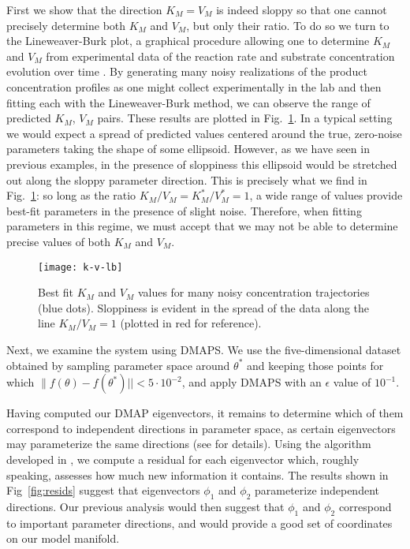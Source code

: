 First we show that the direction $K_M = V_M$ is indeed sloppy so that
one cannot precisely determine both $K_M$ and $V_M$, but only their
ratio. To do so we turn to the Lineweaver-Burk plot, a graphical
procedure allowing one to determine $K_M$ and $V_M$ from experimental
data of the reaction rate and substrate concentration evolution over
time \cite{lineweaver_determination_1934}. By generating many noisy realizations of the product
concentration profiles as one might collect experimentally in the lab
and then fitting each with the Lineweaver-Burk method, we can observe
the range of predicted $K_M$, $V_M$ pairs. These results are plotted
in Fig.~\ref{fig:lb}. In a typical setting we would expect a spread of
predicted values centered around the true, zero-noise parameters
taking the shape of some ellipsoid. However, as we have seen in
previous examples, in the presence of sloppiness this ellipsoid would
be stretched out along the sloppy parameter direction. This is
precisely what we find in Fig.~\ref{fig:lb}: so long as the ratio
$K_M/V_M = K_M^*/V_M^* = 1$, a wide range of values provide best-fit
parameters in the presence of slight noise. Therefore, when fitting
parameters in this regime, we must accept that we may not be able to
determine precise values of both $K_M$ and $V_M$.


\begin{figure}
  \centering
  \texttt{[image: k-v-lb]}
  \caption[Lineweaver-Burk fitting results]{Best fit $K_M$ and $V_M$ values for many noisy
    concentration trajectories (blue dots). Sloppiness is evident in
    the spread of the data along the line $K_M/V_M = 1$ (plotted in
    red for reference). \label{fig:lb} }
\end{figure}

Next, we examine the system using DMAPS. We use the five-dimensional
dataset obtained by sampling parameter space around $\theta^*$ and
keeping those points for which
$\|f(\theta) - f(\theta^*) || < 5 \cdot 10^{-2}$, and apply DMAPS
with an $\epsilon$ value of $10^{-1}$.

Having computed our DMAP eigenvectors, it remains to determine which
of them correspond to independent directions in parameter space, as
certain eigenvectors may parameterize the same directions (see
\cite{dsilva_parsimonious_2015} for details). Using the algorithm
developed in \cite{dsilva_parsimonious_2015}, we compute a residual
for each eigenvector which, roughly speaking, assesses how much new
information it contains. The results shown in Fig~\ref{fig:resids}
suggest that eigenvectors $\phi_1$ and $\phi_2$ parameterize
independent directions. Our previous analysis would then suggest that
$\phi_1$ and $\phi_2$ correspond to important parameter directions,
and would provide a good set of coordinates on our model manifold.

